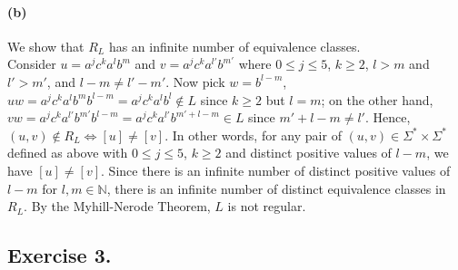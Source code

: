 \documentclass[12pt]{article}
\begin{document}
\paragraph*{(b)} We show that \(R_L\) has an infinite number of equivalence classes. \\
Consider \(u = a^jc^ka^lb^m\) and \(v = a^jc^ka^{l'}b^{m'}\) where \(0 \leq j \leq 5\), \(k \geq 2\), \(l > m\) and \(l' > m'\), and \(l - m \neq l' - m'\). Now pick \(w = b^{l-m}\), \(uw = a^jc^ka^lb^mb^{l-m} = a^jc^ka^lb^l \notin L\) since \(k \geq 2\) but \(l = m\); on the other hand, \(vw = a^jc^ka^{l'}b^{m'}b^{l-m} = a^jc^ka^{l'}b^{m'+l-m} \in L\) since \(m'+l-m \neq l'\). Hence, \((u, v) \notin R_L \Leftrightarrow [u] \neq [v]\). In other words, for any pair of \((u, v) \in \Sigma^* \times \Sigma^*\) defined as above with \(0 \leq j \leq 5\), \(k \geq 2\) and distinct positive values of \(l-m\), we have \([u] \neq [v]\). Since there is an infinite number of distinct positive values of \(l-m\) for \(l, m \in \mathbb{N}\), there is an infinite number of distinct equivalence classes in \(R_L\). By the Myhill-Nerode Theorem, \(L\) is not regular.

\subsection*{Exercise 3.}
\end{document}
